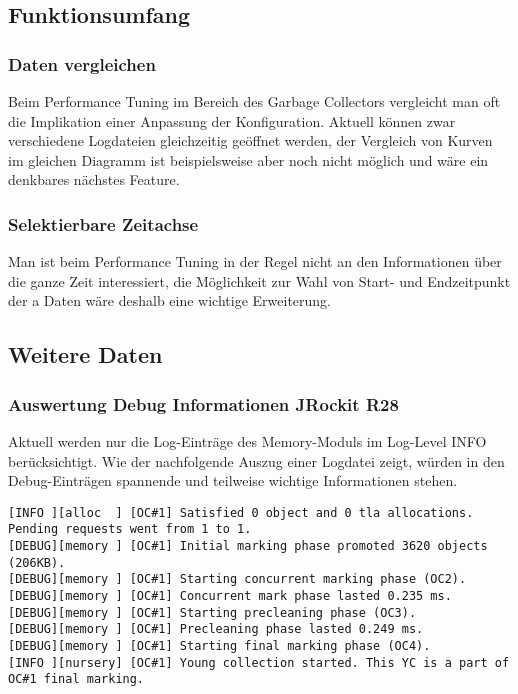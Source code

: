 \subsection{Funktionsumfang}
\subsubsection{Daten vergleichen}
Beim Performance Tuning im Bereich des Garbage Collectors vergleicht man oft die Implikation einer Anpassung der Konfiguration. Aktuell können zwar verschiedene Logdateien gleichzeitig geöffnet werden, der Vergleich von Kurven im gleichen Diagramm ist beispielsweise aber noch nicht möglich und wäre ein denkbares nächstes Feature.

\subsubsection{Selektierbare Zeitachse}
Man ist beim Performance Tuning in der Regel nicht an den Informationen über die ganze Zeit interessiert, die Möglichkeit zur Wahl von Start- und Endzeitpunkt der a Daten wäre deshalb eine wichtige Erweiterung.

\subsection{Weitere Daten}
\subsubsection{Auswertung Debug Informationen JRockit R28}\label{analyseumfang_jr28}
Aktuell werden nur die Log-Einträge des Memory-Moduls im Log-Level INFO berücksichtigt. Wie der nachfolgende Auszug einer Logdatei zeigt, würden in den Debug-Einträgen spannende und teilweise wichtige Informationen stehen.

\begin{lstlisting}[caption=Garbage Collection Log (Debug Informationen)]
[INFO ][alloc  ] [OC#1] Satisfied 0 object and 0 tla allocations. Pending requests went from 1 to 1.
[DEBUG][memory ] [OC#1] Initial marking phase promoted 3620 objects (206KB).
[DEBUG][memory ] [OC#1] Starting concurrent marking phase (OC2).
[DEBUG][memory ] [OC#1] Concurrent mark phase lasted 0.235 ms.
[DEBUG][memory ] [OC#1] Starting precleaning phase (OC3).
[DEBUG][memory ] [OC#1] Precleaning phase lasted 0.249 ms.
[DEBUG][memory ] [OC#1] Starting final marking phase (OC4).
[INFO ][nursery] [OC#1] Young collection started. This YC is a part of OC#1 final marking.
\end{lstlisting}

